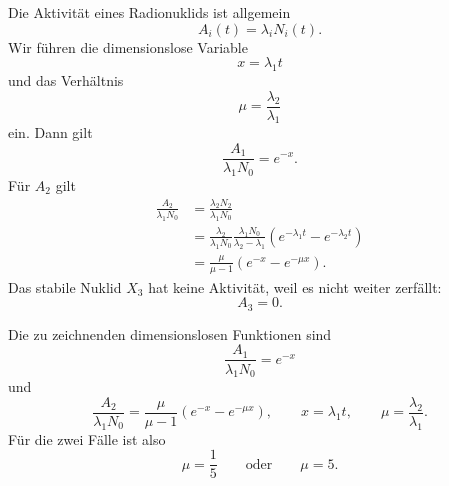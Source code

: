 \documentclass[11pt,a4paper]{scrartcl}
\begin{document}
\begin{enumerate}[label=(\alph*)]
            \begin{calculationbox}
                Die Aktivität eines Radionuklids ist allgemein
                \[
                    A_i(t)=\lambda_iN_i(t).
                \]
                Wir führen die dimensionslose Variable
                \[
                    x=\lambda_1t
                \]
                und das Verhältnis
                \[
                    \mu=\frac{\lambda_2}{\lambda_1}
                \]
                ein. Dann gilt
                \[
                    \frac{A_1}{\lambda_1N_0}=e^{-x}.
                \]
                Für $A_2$ gilt
                \begin{align*}
                    \frac{A_2}{\lambda_1N_0}
                    &=\frac{\lambda_2N_2}{\lambda_1N_0}\\
                    &=\frac{\lambda_2}{\lambda_1N_0}
                    \frac{\lambda_1N_0}{\lambda_2-\lambda_1}
                    \left(e^{-\lambda_1t}-e^{-\lambda_2t}\right)\\
                    &=\frac{\mu}{\mu-1}\left(e^{-x}-e^{-\mu x}\right).
                \end{align*}
                Das stabile Nuklid $X_3$ hat keine Aktivität, weil es nicht weiter zerfällt:
                \[
                    A_3=0.
                \]
            \end{calculationbox}

            \begin{answerbox}
                Die zu zeichnenden dimensionslosen Funktionen sind
                \[
                    \boxed{\frac{A_1}{\lambda_1N_0}=e^{-x}}
                \]
                und
                \[
                    \boxed{\frac{A_2}{\lambda_1N_0}=\frac{\mu}{\mu-1}\left(e^{-x}-e^{-\mu x}\right),
                    \qquad x=\lambda_1t,
                    \qquad \mu=\frac{\lambda_2}{\lambda_1}.}
                \]
                Für die zwei Fälle ist also
                \[
                    \mu=\frac15
                    \qquad\text{oder}\qquad
                    \mu=5.
                \]
            \end{answerbox}


\end{enumerate}
\end{document}
